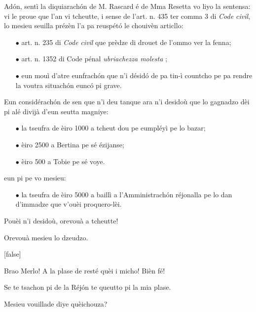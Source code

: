 \begin{drama}
\DzeudzoSenliquerspeaks Adón, sentì la diquiarachón de M. Rascard é de Mma Resetta vo liyo la sentensa: vi le proue que l’an vi tcheutte, i sense de l’art. n. 435 ter comma 3 di \textit{Code civil}, lo mesieu seuilla prézèn l’a pa reuspétó le chouivèn articllo:
\begin{itemize}
\item[$\bullet$] art. n. 235 di \textit{Code civil} que prèdze di drouet de l’ommo ver la fenna;
\item[$\bullet$] art. n. 1352 di Code pénal \textit{ubriachezza molesta} \pionn;
\item[$\bullet$] eun mouì d’atre eunfrachón que n’i désidó de pa tin-ì countcho pe pa rendre la voutra situachón eunc\'o pi grave.
\end{itemize}
Eun considérachón de sen que n’i deu tanque ara n'i desidoù que lo gagnadzo dèi pi alé divijà d’eun seutta magniye:
\begin{itemize}
\item[$\bullet$] la tseufra de èiro 1000 a tcheut dou pe eumpléyì pe lo bazar;
\item[$\bullet$] èiro 2500 a Bertina pe sé ézijanse;
\item[$\bullet$] èiro 500 a Tobie pe sé voye.
\end{itemize}
eun pi pe vo mesieu:
\begin{itemize}
\item[$\bullet$]  la tseufra de èiro 5000 a baillì a l’Amministrachón réjonalla pe lo dan d’immadze que v'ouèi proquero-lèi.
\end{itemize}
Pouèi n'i desidoù, orevouà a tcheutte!

\tcheuttespeaks Orevouà mesieu lo dzeudzo.

[false]




\Eumprezeospeaks Brao Merlo! A la plase de resté quèi i micho!  Bièn fé!

\Simonspeaks {} Se te tsachon pi de la Réjón te queutto pi la mia plase.


\Ritaspeaks {} Mesieu vouillade diye quèichouza?


\end{drama}
